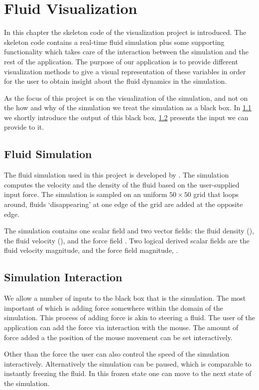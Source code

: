 
\chapter{Fluid Visualization} %
\label{cha:skeleton_compilation}
In this chapter the skeleton code of the visualization project is introduced. The skeleton code contains a real-time fluid simulation plus some supporting functionality which takes care of the interaction between the simulation and the rest of the application. The purpose of our application is to provide different visualization methods to give a visual representation of these variables in order for the user to obtain insight about the fluid dynamics in the simulation. 

As the focus of this project is on the visualization of the simulation, and not on the how and why of the simulation we treat the simulation as a black box. In \cref{sec:fluid_simulation} we shortly introduce the output of this black box, \cref{sub:simulation_interaction} presents the input we can provide to it. 

\section{Fluid Simulation} %
\label{sec:fluid_simulation}
	The fluid simulation used in this project is developed by \textcite{Simulation:Stam:2002}. The simulation computes the velocity and the density of the fluid based on the user-supplied input force. The simulation is sampled on an uniform $50 \times 50$ grid that loops around, \eg fluids `disappearing' at one edge of the grid are added at the opposite edge.

	The simulation contains one scalar field and two vector fields: the fluid density (\density), the fluid velocity (\velocity), and the force field \force. Two logical derived scalar fields are the fluid velocity magnitude, \velocitymagnitude and the force field magnitude, \forcefieldmagnitude. 

\section{Simulation Interaction} %
\label{sub:simulation_interaction}
	We allow a number of inputs to the black box that is the simulation. The most important of which is adding force somewhere within the domain of the simulation. This process of adding force is akin to steering a fluid. The user of the application can add the force via interaction with the mouse. The amount of force added a the position of the mouse movement can be set interactively. 

	Other than the force the user can also control the speed of the simulation interactively. Alternatively the simulation can be paused, which is comparable to instantly freezing the fluid. In this frozen state one can move to the next state of the simulation. 

